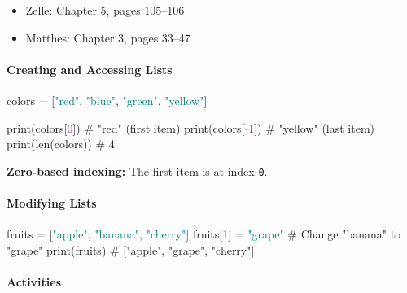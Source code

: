 \documentclass[
  justified,
  openright,
]{tufte-book}
\let\subsubsection\paragraph
\let\paragraph\paragraph
\newcommand{\BuiltInTok}[1]{#1}
\newcommand{\CommentTok}[1]{\textcolor{MidGray}{#1}}
\newcommand{\DecValTok}[1]{\textcolor{Purple}{#1}}
\newcommand{\NormalTok}[1]{#1}
\newcommand{\OperatorTok}[1]{\textcolor{DarkGray}{#1}}
\newcommand{\StringTok}[1]{\textcolor{Teal}{#1}}
\newenvironment{Shaded}{%
  \begin{snugshade}
}{%
  \end{snugshade}
}
\let\subsubsection\paragraph
\let\paragraph\paragraph
\providecommand{\tightlist}{%
  \setlength{\itemsep}{0pt}\setlength{\parskip}{0pt}}
\begin{document}
\begin{itemize}
\tightlist
\item
  Zelle: Chapter 5, pages 105--106
\item
  Matthes: Chapter 3, pages 33--47
\end{itemize}

\subsubsection{Creating and Accessing
Lists}\label{creating-and-accessing-lists}

\begin{Shaded}
\begin{Highlighting}[]
\NormalTok{colors }\OperatorTok{=}\NormalTok{ [}\StringTok{"red"}\NormalTok{, }\StringTok{"blue"}\NormalTok{, }\StringTok{"green"}\NormalTok{, }\StringTok{"yellow"}\NormalTok{]}

\BuiltInTok{print}\NormalTok{(colors[}\DecValTok{0}\NormalTok{])   }\CommentTok{\# "red"   (first item)}
\BuiltInTok{print}\NormalTok{(colors[}\OperatorTok{{-}}\DecValTok{1}\NormalTok{])  }\CommentTok{\# "yellow" (last item)}
\BuiltInTok{print}\NormalTok{(}\BuiltInTok{len}\NormalTok{(colors)) }\CommentTok{\# 4}
\end{Highlighting}
\end{Shaded}

\textbf{Zero-based indexing:} The first item is at index \texttt{0}.

\subsubsection{Modifying Lists}\label{modifying-lists}

\begin{Shaded}
\begin{Highlighting}[]
\NormalTok{fruits }\OperatorTok{=}\NormalTok{ [}\StringTok{"apple"}\NormalTok{, }\StringTok{"banana"}\NormalTok{, }\StringTok{"cherry"}\NormalTok{]}
\NormalTok{fruits[}\DecValTok{1}\NormalTok{] }\OperatorTok{=} \StringTok{"grape"}  \CommentTok{\# Change "banana" to "grape"}
\BuiltInTok{print}\NormalTok{(fruits)         }\CommentTok{\# ["apple", "grape", "cherry"]}
\end{Highlighting}
\end{Shaded}

\subsubsection{Activities}\label{activities-9}
\end{document}
